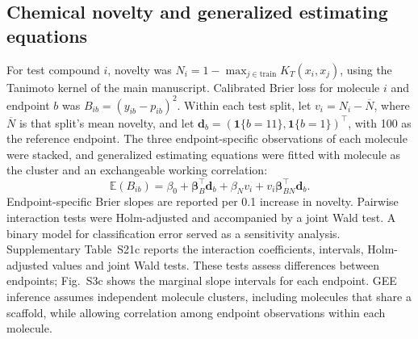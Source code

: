 \documentclass[10pt]{article}
\begin{document}
\subsection*{Chemical novelty and generalized estimating equations}
For test compound \(i\), novelty was \(N_i=1-\max_{j\in\mathrm{train}}K_T(x_i,x_j)\), using the Tanimoto kernel of the main manuscript. Calibrated Brier loss for molecule \(i\) and endpoint \(b\) was \(B_{ib}=(y_{ib}-p_{ib})^2\). Within each test split, let \(v_i=N_i-\overline N\), where \(\overline N\) is that split's mean novelty, and let \(\mathbf d_b=(\mathbf1\{b=11\},\mathbf1\{b=1\})^\top\), with 100 as the reference endpoint. The three endpoint-specific observations of each molecule were stacked, and generalized estimating equations\cite{SiLiang1986} were fitted with molecule as the cluster and an exchangeable working correlation:
\begin{equation}
\mathbb{E}(B_{ib})=\beta_0+\boldsymbol\beta_B^\top\mathbf d_b+\beta_Nv_i+v_i\boldsymbol\beta_{BN}^\top\mathbf d_b.
\label{eq:si-gee}
\end{equation}
Endpoint-specific Brier slopes are reported per 0.1 increase in novelty. Pairwise interaction tests were Holm-adjusted and accompanied by a joint Wald test. A binary model for classification error served as a sensitivity analysis. Supplementary Table~S21c reports the interaction coefficients, intervals, Holm-adjusted values and joint Wald tests. These tests assess differences between endpoints; Fig.~S3c shows the marginal slope intervals for each endpoint. GEE inference assumes independent molecule clusters, including molecules that share a scaffold, while allowing correlation among endpoint observations within each molecule.
\end{document}

